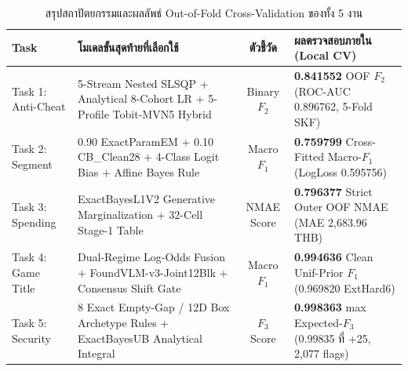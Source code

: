 \documentclass[11pt,a4paper]{article}
\newcommand{\tblfont}{\fontsize{10}{15.0}\selectfont\arrayrulecolor{RuleGray}}
\begin{document}
\begin{table}[H]\centering
{\tblfont
\caption{สรุปสถาปัตยกรรมและผลลัพธ์ Out-of-Fold Cross-Validation ของทั้ง 5 งาน}
\label{tab:overall_results}
\begin{tabular}{L{2.7cm}L{5.4cm}cL{4.6cm}}
\toprule
{} \textbf{Task} & \textbf{โมเดลขั้นสุดท้ายที่เลือกใช้} & \textbf{ตัวชี้วัด} & \textbf{ผลตรวจสอบภายใน (Local CV)} \\
\midrule
Task 1: Anti-Cheat & 5-Stream Nested SLSQP + Analytical 8-Cohort LR + 5-Profile Tobit-MVN5 Hybrid & Binary $F_2$ & \textbf{0.841552} OOF $F_2$ (ROC-AUC 0.896762, 5-Fold SKF) \\
Task 2: Segment & 0.90 ExactParamEM + 0.10 CB\_Clean28 + 4-Class Logit Bias + Affine Bayes Rule & Macro $F_1$ & \textbf{0.759799} Cross-Fitted Macro-$F_1$ (LogLoss 0.595756) \\
Task 3: Spending & ExactBayesL1V2 Generative Marginalization + 32-Cell Stage-1 Table & NMAE Score & \textbf{0.796377} Strict Outer OOF NMAE (MAE 2,683.96 THB) \\
Task 4: Game Title & Dual-Regime Log-Odds Fusion + FoundVLM-v3-Joint12Blk + Consensus Shift Gate & Macro $F_1$ & \textbf{0.994636} Clean Unif-Prior $F_1$ (0.969820 ExtHard6) \\
Task 5: Security & 8 Exact Empty-Gap / 12D Box Archetype Rules + ExactBayesUB Analytical Integral & $F_3$ Score & \textbf{0.998363} max Expected-$F_3$ (0.99835 ที่ +25, 2,077 flags) \\
\bottomrule
\end{tabular}}
\end{table}
\end{document}
